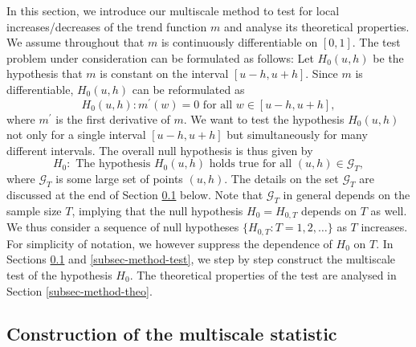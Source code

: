 In this section, we introduce our multiscale method to test for local increases/decreases of the trend function $m$ and analyse its theoretical properties. We assume throughout that $m$ is continuously differentiable on $[0,1]$. The test problem under consideration can be formulated as follows: Let $H_0(u,h)$ be the hypothesis that $m$ is constant on the interval $[u-h,u+h]$. Since $m$ is differentiable, $H_0(u,h)$ can be reformulated as
\[ H_0(u,h): m^\prime(w) = 0 \text { for all } w \in [u-h,u+h], \]
where $m^\prime$ is the first derivative of $m$. We want to test the hypothesis $H_0(u,h)$ not only for a single interval $[u-h,u+h]$ but simultaneously for many different intervals. The overall null hypothesis is thus given by
\[ H_0: \text{ The hypothesis } H_0(u,h) \text{ holds true for all } (u,h) \in \mathcal{G}_T, \]
where $\mathcal{G}_T$ is some large set of points $(u,h)$. The details on the set $\mathcal{G}_T$ are discussed at the end of Section \ref{subsec-method-stat} below. Note that $\mathcal{G}_T$ in general depends on the sample size $T$, implying that the null hypothesis $H_0 = H_{0,T}$ depends on $T$ as well. We thus consider a sequence of null hypotheses $\{H_{0,T}: T = 1,2,\ldots \}$ as $T$ increases. For simplicity of notation, we however suppress the dependence of $H_0$ on $T$. In Sections \ref{subsec-method-stat} and \ref{subsec-method-test}, we step by step construct the multiscale test of the hypothesis $H_0$. The theoretical properties of the test are analysed in Section \ref{subsec-method-theo}. 


\subsection{Construction of the multiscale statistic}\label{subsec-method-stat}


